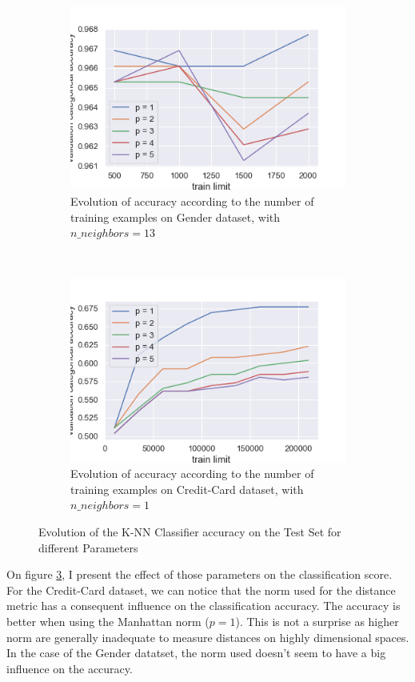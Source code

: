 \documentclass[10pt]{article}
\begin{document}
\begin{figure}
\begin{subfigure}[]{0.45\columnwidth}
				\centering
				\includegraphics[width=\linewidth]{../graphics/knn_gender_train_limit.png}
				\caption{Evolution of accuracy according to the number of training examples on Gender dataset, with $n\_neighbors = 13$}
				\label{knn:g_train_limit}
			\end{subfigure}
			~
			\begin{subfigure}[]{0.45\columnwidth}
				\centering
				\includegraphics[width=\linewidth]{../graphics/knn_creditcard_train_limit.png}
				\caption{Evolution of accuracy according to the number of training examples on Credit-Card dataset, with $n\_neighbors = 1$}
				\label{knn:cc_train_limit}
			\end{subfigure}
			\caption{Evolution of the K-NN Classifier accuracy on the Test Set for different Parameters}
			\label{knn:knn}
		\end{figure}

		On figure \ref{knn:knn}, I present the effect of those parameters on the classification score.
		For the Credit-Card dataset, we can notice that the norm used for the distance metric has a consequent influence on the classification accuracy. The accuracy is better when using the Manhattan norm ($p = 1$). This is not a surprise as higher norm are generally inadequate to measure distances on highly dimensional spaces. In the case of the Gender datatset, the norm used doesn't seem to have a big influence on the accuracy.
\end{document}

